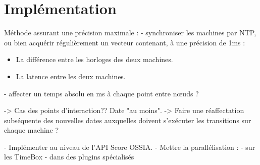\chapter{Implémentation}
Méthode assurant une précision maximale : 
 - synchroniser les machines par NTP, ou bien acquérir régulièrement un vecteur contenant, à une précision de 1ms : 
 \begin{itemize}
 \item La différence entre les horloges des deux machines.
 \item La latence entre les deux machines.
 \end{itemize}
 - affecter un temps absolu en ms à chaque point entre nœuds ?
 
 -> Cas des points d'interaction?? Date "au moins".
 -> Faire une réaffectation subséquente des nouvelles dates auxquelles doivent s'exécuter les transitions sur chaque machine ?
 
 - Implémenter au niveau de l'API Score OSSIA.
 - Mettre la parallélisation : 
   - sur les TimeBox
   - dans des plugins spécialisés